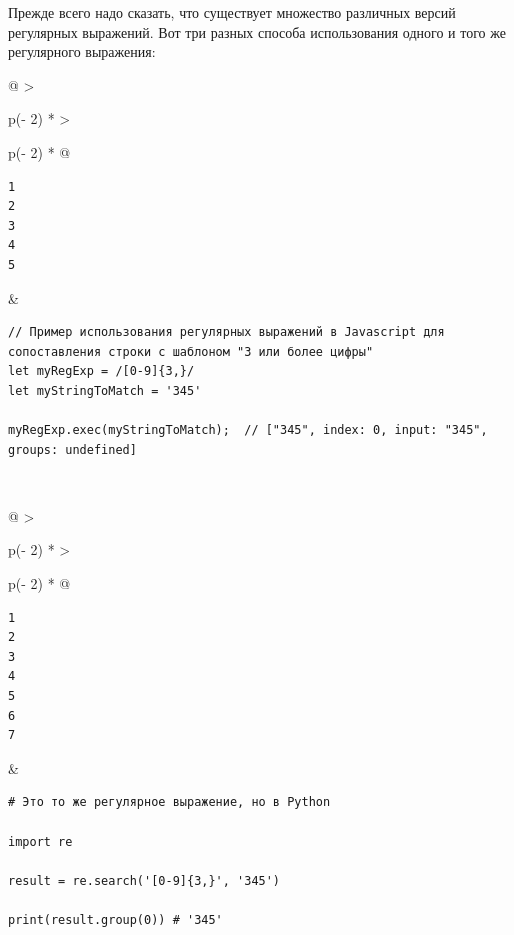 \documentclass{report}
\begin{document}
Прежде всего надо сказать, что существует множество различных версий
регулярных выражений. Вот три разных способа использования одного и того
же регулярного выражения:

\begin{longtable}[]{@{}
  >{\raggedright\arraybackslash}p{(\columnwidth - 2\tabcolsep) * }
  >{\raggedright\arraybackslash}p{(\columnwidth - 2\tabcolsep) * }@{}}
\toprule
\endhead
\begin{minipage}[t]{\linewidth}\raggedright
\begin{verbatim}
1
2
3
4
5
\end{verbatim}
\end{minipage} & \begin{minipage}[t]{\linewidth}\raggedright
\begin{verbatim}
// Пример использования регулярных выражений в Javascript для сопоставления строки с шаблоном "3 или более цифры"
let myRegExp = /[0-9]{3,}/
let myStringToMatch = '345'

myRegExp.exec(myStringToMatch);  // ["345", index: 0, input: "345", groups: undefined]
\end{verbatim}
\end{minipage} \\ \addlinespace
\bottomrule
\end{longtable}

\begin{longtable}[]{@{}
  >{\raggedright\arraybackslash}p{(\columnwidth - 2\tabcolsep) * }
  >{\raggedright\arraybackslash}p{(\columnwidth - 2\tabcolsep) * }@{}}
\toprule
\endhead
\begin{minipage}[t]{\linewidth}\raggedright
\begin{verbatim}
1
2
3
4
5
6
7
\end{verbatim}
\end{minipage} & \begin{minipage}[t]{\linewidth}\raggedright
\begin{verbatim}
# Это то же регулярное выражение, но в Python

import re

result = re.search('[0-9]{3,}', '345')

print(result.group(0)) # '345'
\end{verbatim}
\end{minipage} \\ \addlinespace
\bottomrule
\end{longtable}
\end{document}
